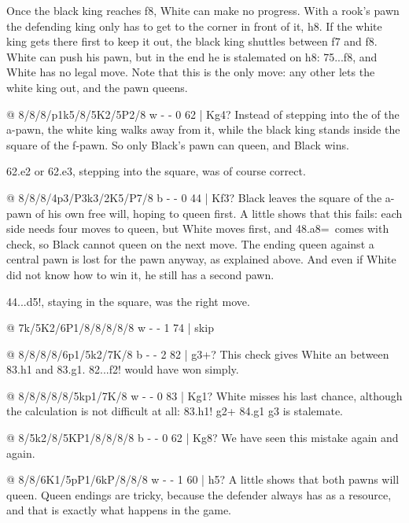 Once the black king reaches f8, White can make no progress. With a rook's pawn the defending king
only has to get to the corner in front of it, h8. If the
white king gets there first to keep it out, the black king shuttles between f7 and f8. White can
push his pawn, but in the end he is stalemated on h8:
75...\K f8, and White has no legal move. Note that this is the only move: any other lets the white
king out, and the pawn queens.

@ 8/8/8/p1k5/8/5K2/5P2/8 w - - 0 62 | Kg4?
Instead of stepping into the  of the a-pawn, the white king walks
away from it, while the black king stands inside the square of the f-pawn. So only Black's pawn can
queen, and Black wins.

62.\K e2 or 62.\K e3, stepping into the square, was of course correct.

@ 8/8/8/4p3/P3k3/2K5/P7/8 b - - 0 44 | Kf3?
Black leaves the square of the a-pawn of his own free will, hoping to queen first. A little
 shows that this fails: each side needs four moves to queen, but
White moves first, and 48.a8=\Q\ comes with check, so Black cannot queen on the next move. The
ending queen against a central pawn is lost for the pawn anyway, as explained above. And even if
White did not know how to win it, he still has a second pawn.

44...\K d5!, staying in the square, was the right move.

@ 7k/5K2/6P1/8/8/8/8/8 w - - 1 74 | skip

@ 8/8/8/8/6p1/5k2/7K/8 b - - 2 82 | g3+?
This check gives White an 
between 83.\K h1 and 83.\K g1. 82...\K f2! would have won simply.

@ 8/8/8/8/8/5kp1/7K/8 w - - 0 83 | Kg1?
White misses his last chance, although the calculation is not difficult at all:
83.\K h1! g2+ 84.\K g1 \K g3 is stalemate.

@ 8/5k2/8/5KP1/8/8/8/8 b - - 0 62 | Kg8?
We have seen this mistake again and again.

@ 8/8/6K1/5pP1/6kP/8/8/8 w - - 1 60 | h5?
A little  shows that both pawns will
queen. Queen endings are tricky, because the defender always has
 as a resource, and that is exactly
what happens in the game.

